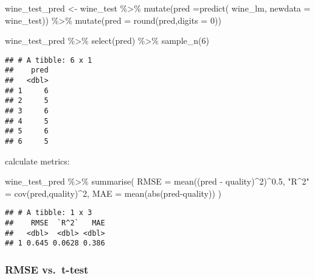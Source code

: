 \documentclass[
]{article}
\newenvironment{Shaded}{\begin{snugshade}}{\end{snugshade}}
\newcommand{\AttributeTok}[1]{\textcolor[rgb]{0.77,0.63,0.00}{#1}}
\newcommand{\DecValTok}[1]{\textcolor[rgb]{0.00,0.00,0.81}{#1}}
\newcommand{\FloatTok}[1]{\textcolor[rgb]{0.00,0.00,0.81}{#1}}
\newcommand{\FunctionTok}[1]{\textcolor[rgb]{0.00,0.00,0.00}{#1}}
\newcommand{\NormalTok}[1]{#1}
\newcommand{\OtherTok}[1]{\textcolor[rgb]{0.56,0.35,0.01}{#1}}
\newcommand{\SpecialCharTok}[1]{\textcolor[rgb]{0.00,0.00,0.00}{#1}}
\newcommand{\StringTok}[1]{\textcolor[rgb]{0.31,0.60,0.02}{#1}}
\begin{document}
\begin{Shaded}
\begin{Highlighting}[]
\NormalTok{wine\_test\_pred }\OtherTok{\textless{}{-}}\NormalTok{ wine\_test }\SpecialCharTok{\%\textgreater{}\%} 
  \FunctionTok{mutate}\NormalTok{(}\AttributeTok{pred =}\FunctionTok{predict}\NormalTok{(}
\NormalTok{    wine\_lm,}
    \AttributeTok{newdata =}\NormalTok{ wine\_test)) }\SpecialCharTok{\%\textgreater{}\%} 
  \FunctionTok{mutate}\NormalTok{(}\AttributeTok{pred =} \FunctionTok{round}\NormalTok{(pred,}\AttributeTok{digits =} \DecValTok{0}\NormalTok{))}

\NormalTok{wine\_test\_pred }\SpecialCharTok{\%\textgreater{}\%} \FunctionTok{select}\NormalTok{(pred) }\SpecialCharTok{\%\textgreater{}\%} \FunctionTok{sample\_n}\NormalTok{(}\DecValTok{6}\NormalTok{)}
\end{Highlighting}
\end{Shaded}

\begin{verbatim}
## # A tibble: 6 x 1
##    pred
##   <dbl>
## 1     6
## 2     5
## 3     6
## 4     5
## 5     6
## 6     5
\end{verbatim}

calculate metrics:

\begin{Shaded}
\begin{Highlighting}[]
\NormalTok{wine\_test\_pred }\SpecialCharTok{\%\textgreater{}\%} 
  \FunctionTok{summarise}\NormalTok{(}
    \AttributeTok{RMSE =} \FunctionTok{mean}\NormalTok{((pred }\SpecialCharTok{{-}}\NormalTok{ quality)}\SpecialCharTok{\^{}}\DecValTok{2}\NormalTok{)}\SpecialCharTok{\^{}}\FloatTok{0.5}\NormalTok{,}
    \StringTok{"R\^{}2"} \OtherTok{=} \FunctionTok{cov}\NormalTok{(pred,quality)}\SpecialCharTok{\^{}}\DecValTok{2}\NormalTok{,}
    \AttributeTok{MAE =} \FunctionTok{mean}\NormalTok{(}\FunctionTok{abs}\NormalTok{(pred}\SpecialCharTok{{-}}\NormalTok{quality))}
\NormalTok{)}
\end{Highlighting}
\end{Shaded}

\begin{verbatim}
## # A tibble: 1 x 3
##    RMSE  `R^2`   MAE
##   <dbl>  <dbl> <dbl>
## 1 0.645 0.0628 0.386
\end{verbatim}

\hypertarget{rmse-vs.-t-test}{%
\subsubsection{RMSE vs.~t-test}\label{rmse-vs.-t-test}}
\end{document}
